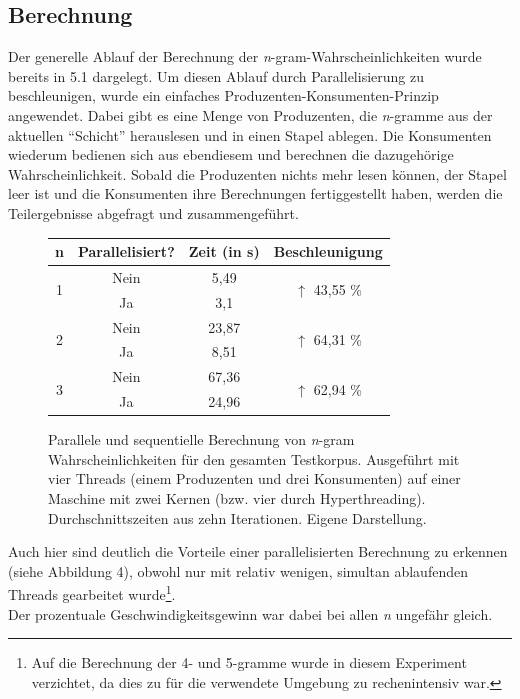 \documentclass[a4paper,12pt]{scrartcl}
\begin{document}
    \subsection{Berechnung}

    Der generelle Ablauf der Berechnung der \emph{n}-gram-Wahrscheinlichkeiten wurde bereits in 5.1 dargelegt. Um diesen Ablauf durch Parallelisierung zu beschleunigen, wurde ein einfaches Produzenten-Konsumenten-Prinzip angewendet. Dabei gibt es eine Menge von Produzenten, die \emph{n}-gramme aus der aktuellen ``Schicht'' herauslesen und in einen Stapel ablegen. Die Konsumenten wiederum bedienen sich aus ebendiesem und berechnen die dazugehörige Wahrscheinlichkeit. Sobald die Produzenten nichts mehr lesen können, der Stapel leer ist und die Konsumenten ihre Berechnungen fertiggestellt haben, werden die Teilergebnisse abgefragt und zusammengeführt. \\

    \begin{figure}[h]
        \centering
        \begin{tabular}{c|c||c|c}
            n & Parallelisiert? & Zeit (in s) & Beschleunigung\\
            \hline \hline
            \multirow{2}{*}{1} & \textcolor{BrickRed}{Nein} & 5,49 & \multirow{2}{*}{\textcolor{OliveGreen}{$\uparrow$ 43,55 \%}}  \\
             & \textcolor{OliveGreen}{Ja} & 3,1 & \\
            \hline
            \multirow{2}{*}{2} & \textcolor{BrickRed}{Nein} & 23,87 & \multirow{2}{*}{\textcolor{OliveGreen}{$\uparrow$ 64,31 \%}} \\
             & \textcolor{OliveGreen}{Ja} & 8,51 & \\
            \hline
            \multirow{2}{*}{3} & \textcolor{BrickRed}{Nein} & 67,36 & \multirow{2}{*}{\textcolor{OliveGreen}{$\uparrow$ 62,94 \%}} \\
             & \textcolor{OliveGreen}{Ja} & 24,96 & \\
        \end{tabular}
        \caption{Parallele und sequentielle Berechnung von \emph{n}-gram Wahrscheinlichkeiten für den gesamten Testkorpus. Ausgeführt mit vier Threads (einem Produzenten und drei Konsumenten) auf einer Maschine mit zwei Kernen (bzw. vier durch Hyperthreading). Durchschnittszeiten aus zehn Iterationen. Eigene Darstellung.}
    \end{figure}

    Auch hier sind deutlich die Vorteile einer parallelisierten Berechnung zu erkennen (siehe Abbildung 4), obwohl nur mit relativ wenigen, simultan ablaufenden Threads gearbeitet wurde\footnote{Auf die Berechnung der 4- und 5-gramme wurde in diesem Experiment verzichtet, da dies zu für die verwendete Umgebung zu rechenintensiv war.}. \\
    Der prozentuale Geschwindigkeitsgewinn war dabei bei allen \emph{n} ungefähr gleich.
\end{document}
